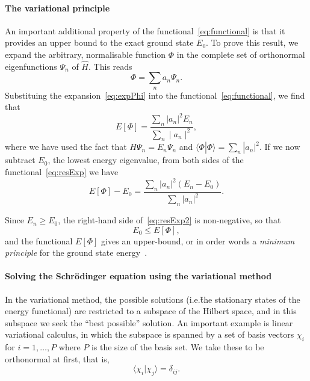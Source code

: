 \paragraph{The variational principle}
\label{sec:varPrinciple}

An important additional property of the functional~\ref{eq:functional} is that it provides an upper bound to the exact ground state $E_0$. To prove this result, we expand the arbitrary, normalisable function $\Phi$ in the complete set of orthonormal eigenfunctions $\Psi_n$ of $\hat{H}$. This reads
\begin{equation}
\label{eq:expPhi}
\Phi = \sum_n a_n \Psi_n.
\end{equation}
Substituing the expansion~\ref{eq:expPhi} into the functional~\ref{eq:functional}, we find that
\begin{equation}
\label{eq:resExp}
E[\Phi] = \frac{\sum_n  | a_n  |^2 E_n}{ \sum_n \mid a_n \mid ^2 },
\end{equation}
where we have used the fact that $H \Psi_n=E_n \Psi_n$ and  $\langle \Phi |\Phi \rangle=\sum_n |a_n|^2$. If we now subtract $E_0$, the lowest energy eigenvalue, from both sides of the functional~\ref{eq:resExp} we have
\begin{equation}
\label{eq:resExp2}
E[\Phi] -E_0= \frac{\sum_n |a_n|^2 (E_n-E_0)}{\sum_n |a_n|^2}.
\end{equation}

Since $E_n \geq E_0$, the right-hand side of~\ref{eq:resExp2} is non-negative, so that
\begin{equation}
\label{eq:varPrincipe}
E_0 \leq E[\Phi],
\end{equation}
and the functional $E[\Phi]$ gives an upper-bound, or in order words a \textit{minimum principle} for the ground state energy~\cite{Bransden2003}.

\paragraph{Solving the Schr\"odinger equation using the variational method}
\label{sec:solvingSEwithVM}
In the variational method, the possible solutions (i.e.\~the stationary states of the energy functional) are restricted to a subspace of the Hilbert space, and in this subspace we seek the ``best possible'' solution. An important example is linear variational calculus, in which the subspace is spanned by a set of basis vectors $\chi_i$ for $i=1,\dots,P$ where $P$ is the size of the basis set. We take these to be orthonormal at first, that is,
\begin{equation*}
\langle \chi_i | \chi_j \rangle = \delta_{ij}.
\end{equation*}

